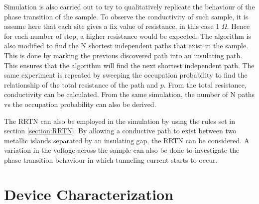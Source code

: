 \documentclass[11pt,a4paper]{report}
\begin{document}
Simulation is also carried out to try to qualitatively replicate the behaviour of the phase transition of the sample. To observe the conductivity of such sample, it is assume here that each site gives a fix value of resistance, in this case 1 $\Omega$. Hence for each number of step, a higher resistance would be expected. The algorithm is also modified to find the N shortest independent paths that exist in the sample. This is done by marking the previous discovered path into an insulating path. This ensures that the algorithm will find the next shortest independent path. The same experiment is repeated by sweeping the occupation probability to find the relationship of the total resistance of the path and $p$. From the total resistance, conductivity can be calculated. From the same simulation, the number of N paths vs the occupation probability can also be derived.

The RRTN can also be employed in the simulation by using the rules set in section \ref{section:RRTN}. By allowing a conductive path to exist between two metallic islands separated by an insulating gap, the RRTN can be considered. A variation in the voltage across the sample can also be done to investigate the phase transition behaviour in which tunneling current starts to occur.

\section{Device Characterization}
\end{document}
